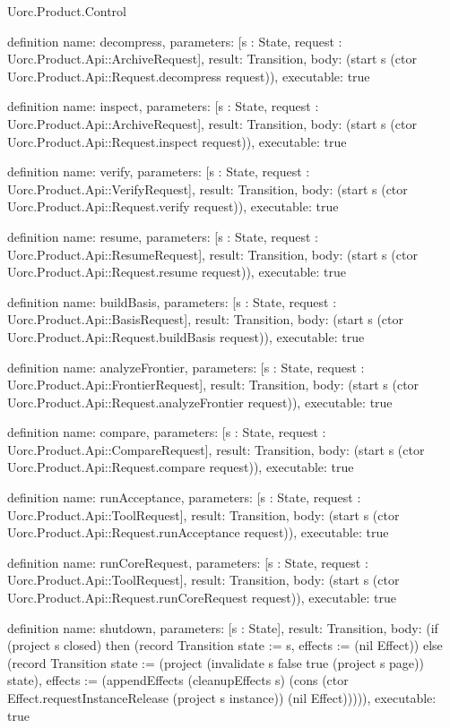 \begin{lexlean}{Uorc.Product.Control}
\begin{semanticmodule}
definition{
  name: decompress,
  parameters: [s : State, request : Uorc.Product.Api::ArchiveRequest],
  result: Transition,
  body: (start s (ctor Uorc.Product.Api::Request.decompress request)),
  executable: true
}

definition{
  name: inspect,
  parameters: [s : State, request : Uorc.Product.Api::ArchiveRequest],
  result: Transition,
  body: (start s (ctor Uorc.Product.Api::Request.inspect request)),
  executable: true
}

definition{
  name: verify,
  parameters: [s : State, request : Uorc.Product.Api::VerifyRequest],
  result: Transition,
  body: (start s (ctor Uorc.Product.Api::Request.verify request)),
  executable: true
}

definition{
  name: resume,
  parameters: [s : State, request : Uorc.Product.Api::ResumeRequest],
  result: Transition,
  body: (start s (ctor Uorc.Product.Api::Request.resume request)),
  executable: true
}

definition{
  name: buildBasis,
  parameters: [s : State, request : Uorc.Product.Api::BasisRequest],
  result: Transition,
  body: (start s (ctor Uorc.Product.Api::Request.buildBasis request)),
  executable: true
}

definition{
  name: analyzeFrontier,
  parameters: [s : State, request : Uorc.Product.Api::FrontierRequest],
  result: Transition,
  body: (start s (ctor Uorc.Product.Api::Request.analyzeFrontier request)),
  executable: true
}

definition{
  name: compare,
  parameters: [s : State, request : Uorc.Product.Api::CompareRequest],
  result: Transition,
  body: (start s (ctor Uorc.Product.Api::Request.compare request)),
  executable: true
}

definition{
  name: runAcceptance,
  parameters: [s : State, request : Uorc.Product.Api::ToolRequest],
  result: Transition,
  body: (start s (ctor Uorc.Product.Api::Request.runAcceptance request)),
  executable: true
}

definition{
  name: runCoreRequest,
  parameters: [s : State, request : Uorc.Product.Api::ToolRequest],
  result: Transition,
  body: (start s (ctor Uorc.Product.Api::Request.runCoreRequest request)),
  executable: true
}

definition{
  name: shutdown,
  parameters: [s : State],
  result: Transition,
  body: (if (project s closed) then (record Transition {state := s, effects := (nil Effect)}) else (record Transition {state := (project (invalidate s false true (project s page)) state), effects := (appendEffects (cleanupEffects s) (cons (ctor Effect.requestInstanceRelease (project s instance)) (nil Effect)))})),
  executable: true
}


\end{semanticmodule}
\end{lexlean}
